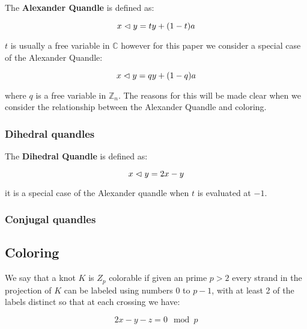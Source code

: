 \documentclass[paper.tex]{subfiles}
\begin{document}
The \textbf{Alexander Quandle} is defined as:

$$ x \vartriangleleft y = ty + (1 - t)a $$

$t$ is usually a free variable in $\mathbb{C}$ however for this paper we consider a special case of the Alexander Quandle:

$$ x \vartriangleleft y = qy + (1 - q)a $$

where $q$ is a free variable in $\mathbb{Z}_n$. The reasons for this will be made clear when we consider the relationship between the Alexander Quandle and coloring.

\subsubsection{Dihedral quandles}
\label{sec:dihedral}

The \textbf{Dihedral Quandle} is defined as:

$$x\vartriangleleft y = 2x - y$$

it is a special case of the Alexander quandle when $t$ is evaluated at $-1$.


\subsubsection{Conjugal quandles}
\label{sec:conjugal}

\subsection{Coloring}

We say that a knot $K$ is $Z_p$ colorable if given an prime $p > 2$ every strand in the projection of $K$ can be labeled using numbers $0$ to $p-1$, with at least 2 of the labels distinct so that at each crossing we have:

$$ 2x - y - z = 0 \mod p $$
\end{document}

